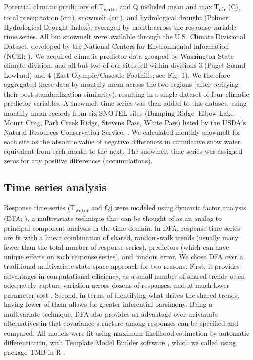 \documentclass[notitlepage]{article}
\begin{document}
Potential climatic predictors of T\textsubscript{water} and Q included mean and max T\textsubscript{air} (\degree C), total precipitation (cm), snowmelt (cm), and hydrological drought (Palmer Hydrological Drought Index), averaged by month across the response variable time series. All but snowmelt were available through the U.S. Climate Divisional Dataset, developed by the National Centers for Environmental Information (NCEI; \citealt{climateData}). We acquired climatic predictor data grouped by Washington State climate division, and all but two of our sites fell within divisions 3 (Puget Sound Lowland) and 4 (East Olympic/Cascade Foothills; see Fig. 1). We therefore aggregated these data by monthly mean across the two regions (after verifying their post-standardization similarity), resulting in a single dataset of four climatic predictor variables. A snowmelt time series was then added to this dataset, using monthly mean records from six SNOTEL sites (Bumping Ridge, Elbow Lake, Mount Crag, Park Creek Ridge, Stevens Pass, White Pass) listed by the USDA's Natural Resources Conservation Service; \citealt{snowData}. We calculated monthly snowmelt for each site as the absolute value of negative differences in cumulative snow water equivalent from each month to the next. The snowmelt time series was assigned zeros for any positive differences (accumulations).

\subsection*{Time series analysis}
Response time series (T\textsubscript{water} and Q) were modeled using dynamic factor analysis (DFA; \citealt{zuur2003estimating}), a multivariate technique that can be thought of as an analog to principal component analysis in the time domain. In DFA, response time series are fit with a linear combination of shared, random-walk trends (usually many fewer than the total number of response series), predictors (which can have unique effects on each response series), and random error. We chose DFA over a traditional multivariate state space approach for two reasons. First, it provides advantages in computational efficiency, as a small number of shared trends often adequately capture variation across dozens of responses, and at much lower parameter cost \citep{zuur2003dynamic}. Second, in terms of identifying what drives the shared trends, having fewer of them allows for greater inferential parsimony. Being a multivariate technique, DFA also provides an advantage over univariate alternatives in that covariance structure among responses can be specified and compared. All models were fit using maximum likelihood estimation by automatic differentiation, with Template Model Builder software \citep{kristensen2015tmb}, which we called using package TMB in R \citep{Rmanual,tmbPackage}.
\end{document}
